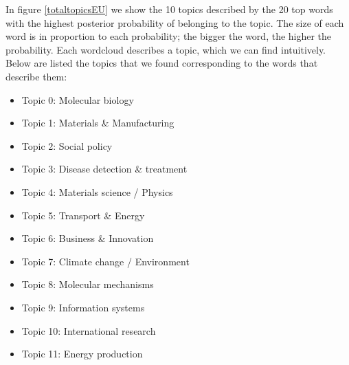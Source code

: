 \documentclass[12pt]{report}
\begin{document}
In figure \ref{totaltopicsEU} we show the 10 topics described by
the 20 top words with the highest posterior probability of belonging
to the topic. The size of each word is in proportion to each
probability; the bigger the word, the higher the probability. Each
wordcloud describes a topic, which we can find intuitively. Below are
listed the topics that we found corresponding to the words that
describe them:
\begin{itemize}
\item[] Topic 0: Molecular biology
\item[] Topic 1: Materials \& Manufacturing
\item[] Topic 2: Social policy
\item[] Topic 3: Disease detection \& treatment
\item[] Topic 4: Materials science / Physics
\item[] Topic 5: Transport \& Energy
\item[] Topic 6: Business \& Innovation
\item[] Topic 7: Climate change / Environment
\item[] Topic 8: Molecular mechanisms
\item[] Topic 9: Information systems
\item[] Topic 10: International research
\item[] Topic 11: Energy production
\end{itemize}
\end{document}
